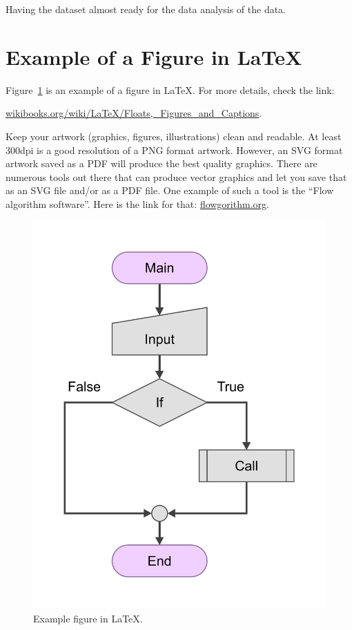 Having the dataset almost ready for the data analysis of the data.
            

\section{Example of a Figure in \LaTeX}
Figure~\ref{fig:chart_a} is an example of a figure in \LaTeX. For more details, check the link:

\href{https://en.wikibooks.org/wiki/LaTeX/Floats,_Figures_and_Captions}{wikibooks.org/wiki/LaTeX/Floats,\_Figures\_and\_Captions}.

\noindent
Keep your artwork (graphics, figures, illustrations) clean and readable. At least 300dpi is a good resolution of a PNG format artwork. However, an SVG format artwork saved as a PDF will produce the best quality graphics. There are numerous tools out there that can produce vector graphics and let you save that as an SVG file and/or as a PDF file. One example of such a tool is the ``Flow algorithm software''. Here is the link for that: \href{http://www.flowgorithm.org/download/}{flowgorithm.org}.
\begin{figure}[ht]
    \centering
    \includegraphics[scale=0.3]{figures/chart.pdf}
    \caption{Example figure in \LaTeX.}
    \label{fig:chart_a}
\end{figure}

